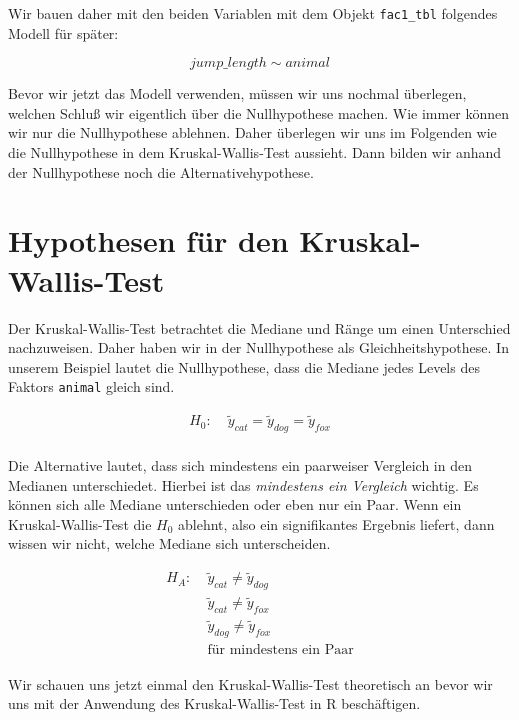 \documentclass[
  letterpaper,
  DIV=11,
  oneside]{scrreport}
\begin{document}
Wir bauen daher mit den beiden Variablen mit dem Objekt
\texttt{fac1\_tbl} folgendes Modell für später:

\[
jump\_length \sim animal
\]

Bevor wir jetzt das Modell verwenden, müssen wir uns nochmal überlegen,
welchen Schluß wir eigentlich über die Nullhypothese machen. Wie immer
können wir nur die Nullhypothese ablehnen. Daher überlegen wir uns im
Folgenden wie die Nullhypothese in dem Kruskal-Wallis-Test aussieht.
Dann bilden wir anhand der Nullhypothese noch die Alternativehypothese.

\hypertarget{hypothesen-fuxfcr-den-kruskal-wallis-test}{%
\section{Hypothesen für den
Kruskal-Wallis-Test}\label{hypothesen-fuxfcr-den-kruskal-wallis-test}}

Der Kruskal-Wallis-Test betrachtet die Mediane und Ränge um einen
Unterschied nachzuweisen. Daher haben wir in der Nullhypothese als
Gleichheitshypothese. In unserem Beispiel lautet die Nullhypothese, dass
die Mediane jedes Levels des Faktors \texttt{animal} gleich sind.

\begin{align*}
H_0: &\; \widetilde{y}_{cat} = \widetilde{y}_{dog} = \widetilde{y}_{fox}\\
\end{align*}

Die Alternative lautet, dass sich mindestens ein paarweiser Vergleich in
den Medianen unterschiedet. Hierbei ist das \emph{mindestens ein
Vergleich} wichtig. Es können sich alle Mediane unterschieden oder eben
nur ein Paar. Wenn ein Kruskal-Wallis-Test die \(H_0\) ablehnt, also ein
signifikantes Ergebnis liefert, dann wissen wir nicht, welche Mediane
sich unterscheiden.

\begin{align*}
H_A: &\; \widetilde{y}_{cat} \ne \widetilde{y}_{dog}\\
\phantom{H_A:} &\; \widetilde{y}_{cat} \ne \widetilde{y}_{fox}\\
\phantom{H_A:} &\; \widetilde{y}_{dog} \ne \widetilde{y}_{fox}\\
\phantom{H_A:} &\; \mbox{für mindestens ein Paar}
\end{align*}

Wir schauen uns jetzt einmal den Kruskal-Wallis-Test theoretisch an
bevor wir uns mit der Anwendung des Kruskal-Wallis-Test in R
beschäftigen.
\end{document}
